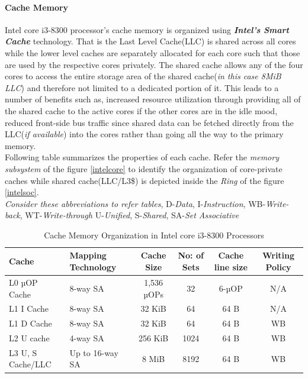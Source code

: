 \documentclass[a4paper,11pt]{article}
\begin{document}
\paragraph{Cache Memory}
Intel core i3-8300 processor's cache memory is organized using \textbf{\textit{Intel's Smart Cache}} technology. That is the Last Level Cache(LLC) is shared across all cores while the lower level caches are separately allocated for each core such that those  are used by the respective cores privately. The shared cache allows any of the four cores to access the entire storage area of the shared cache(\textit{in this case 8MiB LLC}) and therefore not limited to a dedicated portion of it. This leads to a number of benefits such as, increased resource utilization through providing all of the shared cache to the active cores if the other cores are in the idle mood, reduced front-side bus traffic since shared data can be fetched directly from the LLC(\textit{if available}) into the cores  rather than going all the way to the primary memory\cite{smartcache}.\\

 Following table summarizes the properties of each cache. Refer the \textit{memory subsystem} of the figure \ref{intelcore} to identify the organization of core-private caches while shared cache(LLC/L3\$) is depicted inside the \textit{Ring} of the figure \ref{intelsoc}.\\

{\footnotesize \textit{Consider these abbreviations to refer tables},
D-\textit{Data}, I-\textit{Instruction}, WB-\textit{Write-back}, WT-\textit{Write-through} U-\textit{Unified}, S-\textit{Shared}, SA-\textit{Set Associative}}

 \begin{table}[!h]
	\centering
	\begin{tabular}{l| l |c |c |c|c}
		Cache  & Mapping Technology &Cache Size & No: of Sets&Cache line size& Writing Policy\\
		\hline
		L0 µOP Cache&8-way SA&1,536 µOPs&32&6-µOP&	N/A\\
		L1 I Cache &8-way SA&32 KiB&64&64 B&N/A\\
		L1 D Cache&8-way SA&32 KiB&64&64 B&WB\\
		L2 U cache&4-way SA&256 KiB&1024&64 B&WB\\
		L3 U, S Cache/LLC&Up to 16-way SA&8 MiB&8192&64 B&WB\\
		\hline\hline
	\end{tabular}
	\caption{Cache Memory Organization in Intel core i3-8300 Processors\cite{Coffee}}
\end{table}
\end{document}
